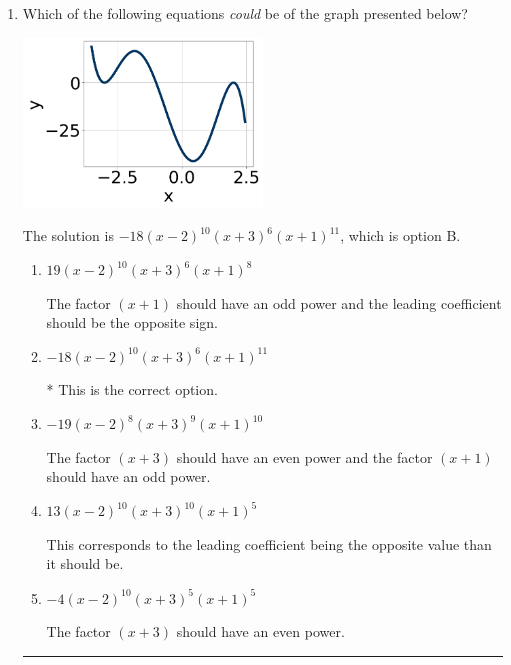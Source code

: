 \documentclass{extbook}[14pt]
\newcommand{\litem}[1]{\item #1

\rule{\textwidth}{0.4pt}}
\begin{document}
\begin{enumerate}\litem{
Which of the following equations \textit{could} be of the graph presented below?

\begin{center}
    \includegraphics[width=0.5\textwidth]{../Figures/polyGraphToFunctionC.png}
\end{center}


The solution is \( -18(x - 2)^{10} (x + 3)^{6} (x + 1)^{11} \), which is option B.\begin{enumerate}[label=\Alph*.]
\item \( 19(x - 2)^{10} (x + 3)^{6} (x + 1)^{8} \)

The factor $(x + 1)$ should have an odd power and the leading coefficient should be the opposite sign.
\item \( -18(x - 2)^{10} (x + 3)^{6} (x + 1)^{11} \)

* This is the correct option.
\item \( -19(x - 2)^{8} (x + 3)^{9} (x + 1)^{10} \)

The factor $(x + 3)$ should have an even power and the factor $(x + 1)$ should have an odd power.
\item \( 13(x - 2)^{10} (x + 3)^{10} (x + 1)^{5} \)

This corresponds to the leading coefficient being the opposite value than it should be.
\item \( -4(x - 2)^{10} (x + 3)^{5} (x + 1)^{5} \)

The factor $(x + 3)$ should have an even power.
\end{enumerate}

}
\end{enumerate}
\end{document}
